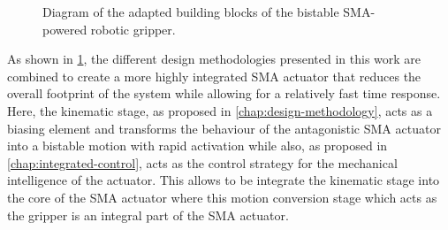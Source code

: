 \begin{figure}[hbt!] %
  \centering
  \caption{Diagram of the adapted building blocks of the bistable SMA-powered robotic gripper.}
  \label{fig:building-blocks-smabb}
\end{figure}

As shown in \cref{fig:building-blocks-smabb}, the different design methodologies presented in this work are combined to create a more highly integrated SMA actuator that reduces the overall footprint of the system while allowing for a relatively fast time response. Here, the kinematic stage, as proposed in \cref{chap:design-methodology}, acts as a biasing element and transforms the behaviour of the antagonistic SMA actuator into a bistable motion with rapid activation while also, as proposed in \cref{chap:integrated-control}, acts as the control strategy for the mechanical intelligence of the actuator. This allows to be integrate the kinematic stage into the core of the SMA actuator where this motion conversion stage which acts as the gripper is an integral part of the SMA actuator.

